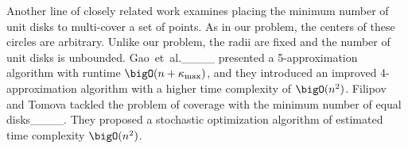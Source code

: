 Another line of closely related work examines placing the minimum number of unit disks to multi-cover a set of points.
As in our problem, the centers of these circles are arbitrary.
Unlike our problem, the radii are fixed and the number of unit disks is unbounded.
Gao~et~al.____ presented a 5-approximation algorithm with runtime $\bigO(n + \kappa_\text{max})$, and they introduced an improved 4-approximation algorithm with a higher time complexity of $\bigO(n^2)$. 
Filipov and Tomova tackled the problem of coverage with the minimum number of equal disks____.
They proposed a stochastic optimization algorithm of estimated time complexity $\bigO(n^2)$.